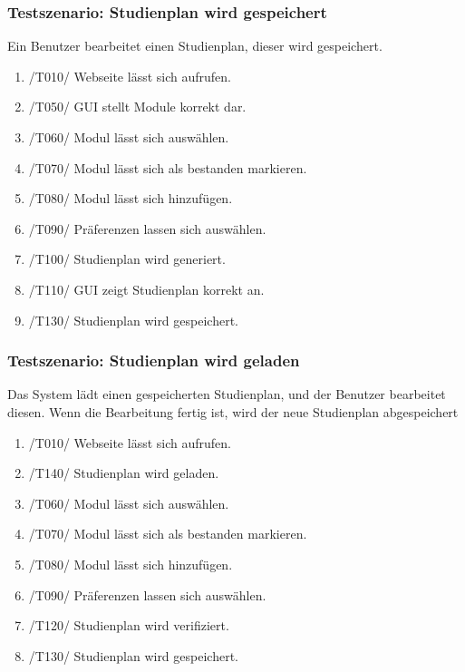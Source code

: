 \documentclass[parskip=full]{scrartcl}
\begin{document}
		\subsubsection{Testszenario: Studienplan wird gespeichert}

			Ein Benutzer bearbeitet einen Studienplan, dieser wird gespeichert.
		
			\begin{enumerate}
				\item /T010/ Webseite lässt sich aufrufen.
				\item /T050/ GUI stellt Module korrekt dar.
				\item /T060/ Modul lässt sich auswählen.
				\item /T070/ Modul lässt sich als bestanden markieren.
				\item /T080/ Modul lässt sich hinzufügen.
				\item /T090/ Präferenzen lassen sich auswählen.
				\item /T100/ Studienplan wird generiert.
				\item /T110/ GUI zeigt Studienplan korrekt an.
				\item /T130/ Studienplan wird gespeichert.
			\end{enumerate}

		\subsubsection{Testszenario: Studienplan wird geladen}
	
			Das System lädt einen gespeicherten Studienplan, und  der Benutzer bearbeitet diesen. Wenn die Bearbeitung fertig ist, wird der neue Studienplan abgespeichert
	
			\begin{enumerate}
				\item /T010/ Webseite lässt sich aufrufen.
				\item /T140/ Studienplan wird geladen.
				\item /T060/ Modul lässt sich auswählen.
				\item /T070/ Modul lässt sich als bestanden markieren.
				\item /T080/ Modul lässt sich hinzufügen.
				\item /T090/ Präferenzen lassen sich auswählen.
				\item /T120/ Studienplan wird verifiziert.
				\item /T130/ Studienplan wird gespeichert.
			\end{enumerate}
			
\end{document}
